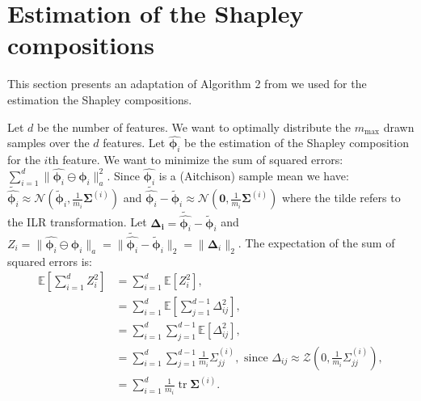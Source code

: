 \documentclass{article}
\theoremstyle{plain}
\theoremstyle{definition}
\theoremstyle{remark}
\DeclareMathOperator{\tr}{tr}
\begin{document}
\newpage
\section{Estimation of the Shapley compositions}
\label{app:algo}
This section presents an adaptation of Algorithm 2 from \cite{vstrumbelj2014explaining} we used for the estimation the Shapley compositions.

Let $d$ be the number of features. We want to optimally distribute the $m_{\text{max}}$ drawn samples over the $d$ features. Let $\hat{\bm{\phi}_i}$ be the estimation of the Shapley composition for the $i$th feature. We want to minimize the sum of squared errors: $\displaystyle\sum_{i=1}^{d} \| \hat{\bm{\phi}_i} \ominus \bm{\phi}_i \|_a^2$. Since $\hat{\bm{\phi}_i}$ is a (Aitchison) sample mean we have: $\tilde{\hat{\bm{\phi}_i}} \approx \mathcal{N}(\tilde{\bm{\phi}}_i, \frac{1}{m_i}\bm{\Sigma}^{(i)})$ and $\tilde{\hat{\bm{\phi}_i}} - \tilde{\bm{\phi}}_i \approx \mathcal{N}(\bm{0}, \frac{1}{m_i}\bm{\Sigma}^{(i)})$ where the tilde refers to the ILR transformation.
Let $\bm{\Delta_i} = \tilde{\hat{\bm{\phi}_i}} - \tilde{\bm{\phi}}_i$ and $Z_i = \| \hat{\bm{\phi}_i} \ominus \bm{\phi}_i \|_a = \| \tilde{\hat{\bm{\phi}_i}} - \tilde{\bm{\phi}}_i \|_2 = \| \bm{\Delta}_i \|_2$. The expectation of the sum of squared errors is:
\begin{equation}
  \begin{aligned}
    \mathbb{E}\left[ \sum_{i=1}^{d} Z_i^2 \right] &=   \sum_{i=1}^{d} \mathbb{E}\left[ Z_i^2 \right],\\
                                                  & =\sum_{i=1}^{d} \mathbb{E}\left[ \sum_{j=1}^{d-1}\Delta_{ij}^2 \right],\\
                                                  & =\sum_{i=1}^{d} \sum_{j=1}^{d-1} \mathbb{E}\left[\Delta_{ij}^2 \right],\\
                                                  & =\sum_{i=1}^{d} \sum_{j=1}^{d-1} \frac{1}{m_i}\Sigma_{jj}^{(i)}, \text{ since } \Delta_{ij}\approx \mathcal{Z}(0, \frac{1}{m_i}\Sigma_{jj}^{(i)}),\\
    &= \sum_{i=1}^d \frac{1}{m_i} \tr \bm{\Sigma}^{(i)}.
  \end{aligned}
\end{equation}
\end{document}
